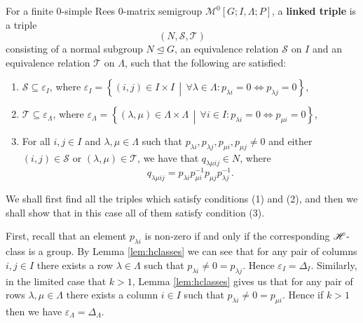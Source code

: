 \begin{definition}
  \label{def:linkedtriple}
  For a finite 0-simple Rees 0-matrix semigroup
  $\mathcal{M}^0[G;I,\Lambda;P]$, a \textbf{linked triple} is a
  triple $$(N,\mathcal{S},\mathcal{T})$$ consisting of a normal subgroup $N
  \trianglelefteq G$, an equivalence relation $\mathcal{S}$ on $I$ and an
  equivalence relation $\mathcal{T}$ on $\Lambda$, such that the following are
  satisfied:
  \begin{enumerate}[\rm(1)]
  \item $\mathcal{S} \subseteq \varepsilon_I$, where $\varepsilon_I =
    \left\{(i,j) \in I \times I\, \middle|\, \forall \lambda \in \Lambda:
      p_{\lambda i}=0 \iff p_{\lambda j}=0 \right\}$,
  \item $\mathcal{T} \subseteq \varepsilon_\Lambda$, where $\varepsilon_\Lambda
    = \left\{(\lambda,\mu) \in \Lambda \times \Lambda\, \middle|\, \forall i \in
      I: p_{\lambda i}=0 \iff p_{\mu i}=0 \right\}$,
  \item For all $i,j \in I$ and $\lambda, \mu \in \Lambda$ such that
    $p_{\lambda i}, p_{\lambda j}, p_{\mu i}, p_{\mu j} \neq 0$ and either
    $(i,j) \in \mathcal{S}$ or $(\lambda,\mu) \in \mathcal{T}$, we have
    that $q_{\lambda \mu i j} \in N$, where $$q_{\lambda \mu i j} = p_{\lambda
      i} p_{\mu i}^{-1} p_{\mu j} p_{\lambda j}^{-1}.$$
  \end{enumerate}
  \cite[p.86]{howie}
\end{definition}

We shall first find all the triples which satisfy conditions (1) and (2), and
then we shall show that in this case all of them satisfy condition (3).

First, recall that an element $p_{\lambda i}$ is non-zero if and only if the
corresponding $\mathrel{\mathscr{H}}$-class is a group.  By Lemma \ref{lem:hclasses} we can see that
for any pair of columns $i,j \in I$ there exists a row $\lambda \in \Lambda$
such that $p_{\lambda i} \neq 0 = p_{\lambda j}$.  Hence $\varepsilon_I =
\Delta_I$.  Similarly, in the limited case that $k>1$, Lemma \ref{lem:hclasses}
gives us that for any pair of rows $\lambda, \mu \in \Lambda$ there exists a
column $i \in I$ such that $p_{\lambda i} \neq 0 = p_{\mu i}$.  Hence if $k>1$
then we have $\varepsilon_\Lambda = \Delta_\Lambda$.

